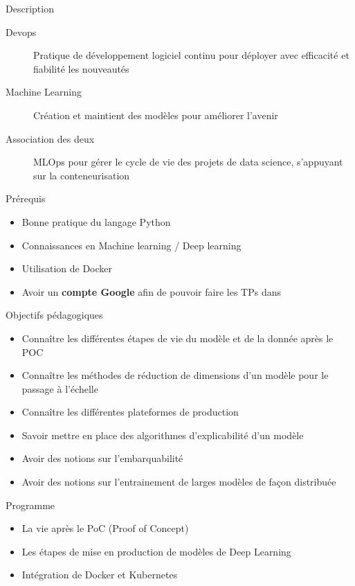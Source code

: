 
\begin{frame}{Description}
  \begin{description}
    \item[Devops] Pratique de développement logiciel continu pour déployer avec efficacité et fiabilité les nouveautés
    \item[Machine Learning] Création et maintient des modèles pour améliorer l'avenir
    \item[Association des deux] \alert{MLOps} pour gérer le cycle de vie des projets de data science, s'appuyant sur la conteneurisation
  \end{description}
\end{frame}

\begin{frame}{Prérequis}
  \begin{itemize}
    \item Bonne pratique du langage Python
    \item Connaissances en Machine learning / Deep learning
    \item Utilisation de Docker
    \item Avoir un \textbf{compte Google} afin de pouvoir faire les TPs dans 
  \end{itemize}
\end{frame}

\begin{frame}{Objectifs pédagogiques}
  \begin{itemize}
    \item Connaître les différentes étapes de vie du modèle et de la donnée après le POC
    \item Connaître les méthodes de réduction de dimensions d'un modèle pour le passage à l'échelle
    \item Connaître les différentes plateformes de production
    \item Savoir mettre en place des algorithmes d'explicabilité d'un modèle
    \item Avoir des notions sur l'embarquabilité
    \item Avoir des notions sur l'entrainement de larges modèles de façon distribuée
  \end{itemize}
\end{frame}

\begin{frame}{Programme}
  \begin{itemize}
    \item La vie après le PoC (Proof of Concept)
    \item Les étapes de mise en production de modèles de Deep Learning
    \item Intégration de Docker et Kubernetes
  \end{itemize}
\end{frame}

